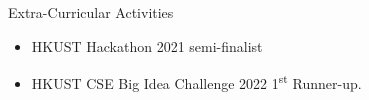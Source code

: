 \documentclass{resume} %
\begin{document}
\begin{rSection}{Extra-Curricular Activities}
    \begin{itemize}
        \item 	HKUST Hackathon 2021 semi-finalist
        \item	HKUST CSE Big Idea Challenge 2022 1\textsuperscript{st} Runner-up.
    \end{itemize}


\end{rSection}




\end{document}
